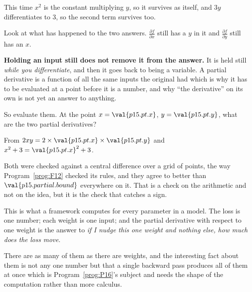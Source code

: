 \begin{fr}
This time $x^{2}$ is the constant multiplying $y$, so it survives as itself,
and $3y$ differentiates to $3$, so the second term survives too.

\begin{trapbox}
Look at what has happened to the two answers. $\frac{\partial f}{\partial x}$
still has a $y$ in it and $\frac{\partial f}{\partial y}$ still has an $x$.

\textbf{Holding an input still does not remove it from the answer.} It is
held still \emph{while you differentiate}, and then it goes back to being a
variable. A partial derivative is a function of all the same inputs the
original had \dash{} which is why it has to be evaluated at a point before it
is a number, and why \enquote{the derivative} on its own is not yet an
answer to anything.
\end{trapbox}
\end{fr}

\begin{fr}
So evaluate them. At the point $x = \val{p15.pt.x}$, $y = \val{p15.pt.y}$,
what are the two partial derivatives?
\dotline
\nextframe
\end{fr}

\begin{fr}
From $2xy = 2 \times \val{p15.pt.x} \times \val{p15.pt.y}$ and
$x^{2} + 3 = \val{p15.pt.x}^{2} + 3$.

Both were checked against a central difference over a grid of points, the way
Program~\ref{prog:F12} checked its rules, and they agree to better than
$\val{p15.partial.bound}$ everywhere on it. That is a check on the
arithmetic and not on the idea, but it is the check that catches a sign.

\begin{aibox}
This is what a framework computes for every parameter in a model. The loss is
one number; each weight is one input; and the partial derivative with respect
to one weight is the answer to \emph{if I nudge this one weight and nothing
else, how much does the loss move}.

There are as many of them as there are weights, and the interesting fact
about them is not any one number but that a single backward pass produces all
of them at once \dash{} which is Program~\ref{prog:P16}'s subject and needs
the shape of the computation rather than more calculus.
\end{aibox}
\end{fr}


